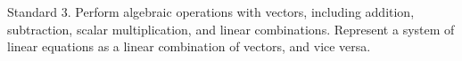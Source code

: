 Standard 3.	Perform algebraic operations with vectors, including addition, subtraction, scalar multiplication, and linear combinations. Represent a system of linear equations as a linear combination of vectors, and vice versa.

\ifprintanswers
\else %
 \newpage
\fi

\begin{solution}
   
\end{solution}